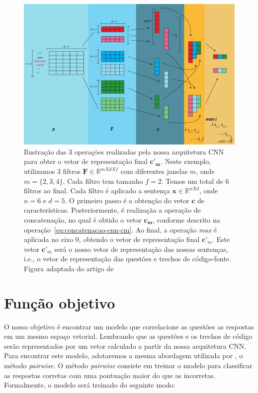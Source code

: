 \begin{figure}[h]
    \centering
    \includegraphics[width=1\textwidth]{figuras/cap-problema/cnn-architecture.pdf}
    \caption{Ilustração das 3 operações realizadas pela nossa arquitetura CNN para obter o vetor de representação final $\bm{c'}_{\bm{m}}$. Neste exemplo, utilizamos 3 filtros $\bm{F} \in \mathbb{R}^{m X d X f}$ com diferentes janelas $m$, onde $m = \{2, 3, 4\}$. Cada filtro tem tamanho $f = 2$. Temos um total de 6 filtros ao final. Cada filtro é aplicado a sentença $\bm{x} \in \mathbb{R}^{n X d}$, onde $n = 6$ e $d = 5$. O primeiro passo é a obtenção do vetor $\bm{c}$ de características. Posteriormente, é realização a operação de concatenação, no qual é obtido o vetor $\bm{c}_{\bm{m}}$, conforme descrito na operação~\ref{eq:concatenacao-cnn-cm}. Ao final, a operação \textit{max} é aplicada no eixo $0$, obtendo o vetor de representação final $\bm{c'}_{m}$. Este vetor $\bm{c'}_{m}$ será o nosso vetor de representação das nossas sentenças, i.e., o vetor de representação das questões e trechos de código-fonte. Figura adaptada do artigo de \cite{zhang-guide-convolutional-cnn-embedding-ilustration:2015}}
    \label{fig:cnn-architecture-proposal}
\end{figure}




\section{Função objetivo}
\label{sec:funcao-objetivo}

O nosso objetivo é encontrar um modelo que correlacione as questões as respostas em um mesmo espaço vetorial. Lembrando que as questões e os trechos de código serão representados por um vetor calculado a partir da nossa arquitetura CNN. Para encontrar este modelo, adotaremos a mesma abordagem utilizada por \cite{feng-2015}, o método \textit{pairwise}. O método \textit{pairwise} consiste em treinar o modelo para classificar as respostas corretas com uma pontuação maior do que as incorretas. Formalmente, o modelo será treinado do seguinte modo:

